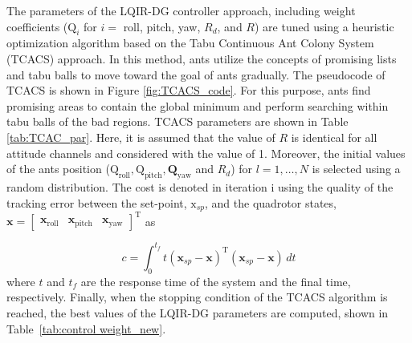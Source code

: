 \documentclass[3p]{elsarticle}
\begin{document}




The parameters of the LQIR-DG controller approach, including weight coefficients ($\boldsymbol{\mathrm{Q}}_i$ for $i=$ roll, pitch, yaw, $R_d$, and $R$) are tuned using a heuristic optimization algorithm based on the Tabu Continuous Ant Colony System (TCACS) \cite{article_TCACS} approach. In this method, ants utilize the concepts of promising lists and tabu balls to move toward the goal of ants gradually. The pseudocode of TCACS is shown in Figure \ref{fig:TCACS_code}. For this purpose, ants find promising areas to contain the global minimum and perform searching within tabu balls of the bad regions. TCACS parameters are shown in Table \ref{tab:TCAC_par}. Here, it is assumed that the value of $R$ is identical for all attitude channels and considered with the value of 1. Moreover, the initial values of the ants position ($ \boldsymbol{\mathrm{Q}}_{\text{roll}}, \boldsymbol{\mathrm{Q}}_{\text{pitch}}, \boldsymbol{{Q}}_{\text{yaw}}$ and $R_d$) for $l=1, \ldots, N$ is selected using a random distribution. The cost is denoted in iteration i using the quality of the tracking error between the set-point, $\boldsymbol{\mathrm{x}}_{sp}$, and the quadrotor states, $\boldsymbol{x} = \begin{bmatrix}
    \boldsymbol{x}_{\text{roll}} & \boldsymbol{x}_{\text{pitch}} & \boldsymbol{x}_{\text{yaw}}
\end{bmatrix}^{\mathrm{T}}$ as

\begin{equation}
    c = \int_{0}^{t_f} t \left(
        \boldsymbol{x}_{sp} - \boldsymbol{x} 
        \right)^\mathrm{T} \left(\boldsymbol{x}_{sp} - \boldsymbol{x} \right) \, dt
\end{equation}
where $t$ and $t_f$ are the response time of the system and the final time, respectively. Finally, when the stopping condition of the TCACS algorithm is reached, the best values of the LQIR-DG parameters are computed, shown in Table~\ref{tab:control weight_new}.
\end{document}
